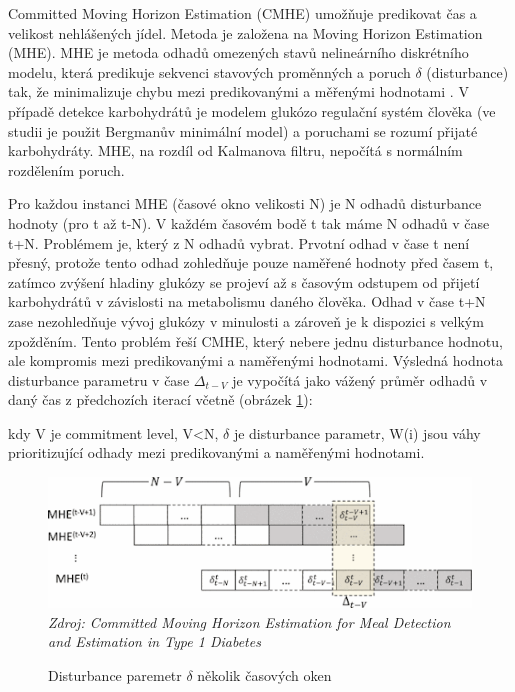 Committed Moving Horizon Estimation (CMHE) \citep{analyzaCHO.MovingHorizon} umožňuje predikovat čas a velikost nehlášených jídel. Metoda je založena na Moving Horizon Estimation (MHE). MHE je metoda odhadů omezených stavů nelineárního diskrétního modelu, která predikuje sekvenci stavových proměnných a poruch $\delta$ (disturbance) tak, že minimalizuje chybu mezi predikovanými a měřenými hodnotami \citep{analyzaCHO.MovingHorizon}. V případě detekce karbohydrátů je modelem glukózo regulační systém člověka (ve studii je použit Bergmanův minimální model) a poruchami se rozumí přijaté karbohydráty. MHE, na rozdíl od Kalmanova filtru, nepočítá s normálním rozdělením poruch. 

Pro každou instanci MHE (časové okno velikosti N) je N odhadů disturbance hodnoty (pro t až t-N). V každém časovém bodě t tak máme N odhadů v čase t+N. Problémem je, který z N odhadů vybrat. Prvotní odhad v čase t není přesný, protože tento odhad zohledňuje pouze naměřené hodnoty před časem t, zatímco zvýšení hladiny glukózy se projeví až s časovým odstupem od přijetí karbohydrátů v závislosti na metabolismu daného člověka. Odhad v čase t+N zase nezohledňuje vývoj glukózy v minulosti a zároveň je k dispozici s velkým zpožděním. Tento problém řeší CMHE, který nebere jednu disturbance hodnotu, ale kompromis mezi predikovanými a naměřenými hodnotami. Výsledná hodnota disturbance parametru v čase $\Delta_{t-V}$ je vypočítá jako vážený průměr odhadů v daný čas z předchozích iterací včetně (obrázek \ref{fig:analyza:horizon1}):


kdy V je commitment level, V<N, $\delta$ je disturbance parametr, W(i) jsou váhy prioritizující odhady mezi predikovanými a naměřenými hodnotami.

\begin{figure}[H]
\caption{Disturbance paremetr $\delta$ několik časových oken}
\label{fig:analyza:horizon1}
\centering
\includegraphics[width=1\textwidth]{img/analyzaCHO/horizon1.png}\\
\textit{Zdroj: Committed Moving Horizon Estimation for Meal Detection and Estimation in Type 1 Diabetes \citep{analyzaCHO.MovingHorizon}}
\end{figure}

